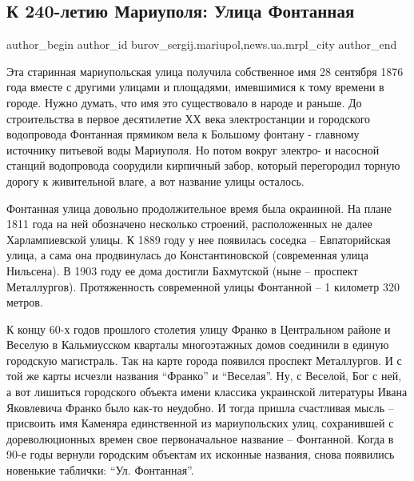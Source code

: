  
 
 
 
 
 
\subsection{К 240-летию Мариуполя: Улица Фонтанная}
\label{sec:15_09_2018.stz.news.ua.mrpl_city.1.k_240_letiu_mariupolja_ulica_fontannaja}
 
\ifcmt
 author_begin
   author_id burov_sergij.mariupol,news.ua.mrpl_city
 author_end
\fi

Эта старинная мариупольская улица получила собственное имя 28 сентября 1876
года вместе с другими улицами и площадями, имевшимися к тому времени в городе.
Нужно думать, что имя это существовало в народе и раньше. До строительства в
первое десятилетие ХХ века электростанции и городского водопровода Фонтанная
прямиком вела к Большому фонтану - главному источнику питьевой воды Мариуполя.
Но потом вокруг электро- и насосной станций водопровода соорудили кирпичный
забор, который перегородил торную дорогу к живительной влаге, а вот название
улицы осталось.

Фонтанная улица довольно продолжительное время была окраинной. На плане 1811
года на ней обозначено несколько строений, расположенных не далее
Харлампиевской улицы. К 1889 году у нее появилась соседка – Евпаторийская
улица, а сама она продвинулась до Константиновской (современная  улица
Нильсена). В 1903 году ее дома достигли Бахмутской (ныне – проспект
Металлургов). Протяженность современной улицы Фонтанной – 1 километр 320
метров.


К концу 60-х годов прошлого столетия улицу Франко в Центральном районе и
Веселую в Кальмиусском кварталы многоэтажных домов соединили в единую городскую
магистраль. Так на карте города появился проспект Металлургов. И с той же карты
исчезли названия \enquote{Франко} и \enquote{Веселая}. Ну, с Веселой, Бог с ней, а вот лишиться
городского объекта имени классика украинской литературы Ивана Яковлевича Франко
было как-то неудобно. И тогда пришла счастливая мысль – присвоить имя Каменяра
единственной из мариупольских улиц, сохранившей с дореволюционных времен свое
первоначальное название – Фонтанной. Когда в 90-е годы вернули городским
объектам их исконные названия, снова появились новенькие таблички: \enquote{Ул. Фонтанная}.

